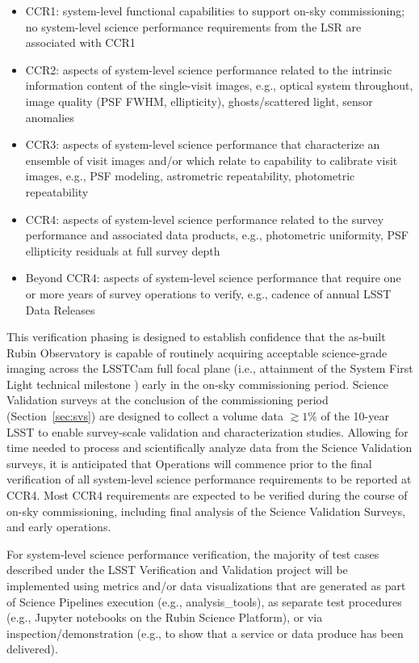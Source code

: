 \begin{itemize}
	\item CCR1: system-level functional capabilities to support on-sky commissioning; no system-level science performance requirements from the LSR are associated with CCR1
	\item CCR2: aspects of system-level science performance related to the intrinsic information content of the single-visit images, e.g., optical system throughout, image quality (PSF FWHM, ellipticity), ghosts/scattered light, sensor anomalies
	\item CCR3: aspects of system-level science performance that characterize an ensemble of visit images and/or which relate to capability to calibrate visit images, e.g., PSF modeling, astrometric repeatability, photometric repeatability
	\item CCR4: aspects of system-level science performance related to the survey performance and associated data products, e.g., photometric uniformity, PSF ellipticity residuals at full survey depth
	\item Beyond CCR4: aspects of system-level science performance that require one or more years of survey operations to verify, e.g., cadence of annual LSST Data Releases
\end{itemize}

This verification phasing is designed to establish confidence that the as-built Rubin Observatory is capable of routinely acquiring acceptable science-grade imaging across the LSSTCam full focal plane (i.e., attainment of the System First Light technical milestone ) early in the on-sky commissioning period.
Science Validation surveys at the conclusion of the commissioning period (Section~\ref{sec:svs}) are designed to collect a volume data $\gtrsim 1\%$ of the 10-year LSST to enable survey-scale validation and characterization studies.
Allowing for time needed to process and scientifically analyze data from the Science Validation surveys, it is anticipated that Operations will commence prior to the final verification of all system-level science performance requirements to be reported at CCR4.
Most CCR4 requirements are expected to be verified during the course of on-sky commissioning, including final analysis of the Science Validation Surveys, and early operations.

For system-level science performance verification, the majority of test cases described under the LSST Verification and Validation project will be implemented using metrics and/or data visualizations that are generated as part of Science Pipelines execution (e.g., analysis\_tools), as separate test procedures (e.g., Jupyter notebooks on the Rubin Science Platform), or via inspection/demonstration (e.g., to show that a service or data produce has been delivered).

